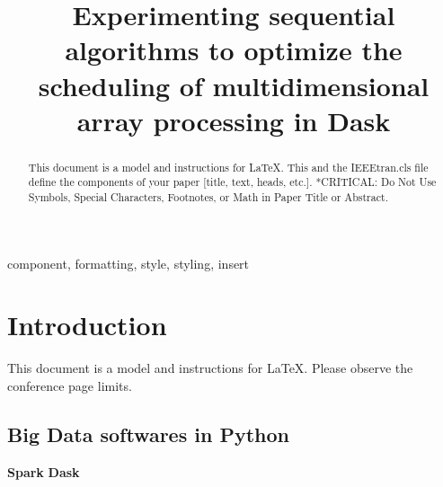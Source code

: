 \documentclass[conference]{IEEEtran}
\begin{document}
\title{ Experimenting sequential algorithms to optimize the scheduling of multidimensional array processing in Dask }

\author{
\and
{}
\and
{}
}

\maketitle

\begin{abstract}
This document is a model and instructions for \LaTeX.
This and the IEEEtran.cls file define the components of your paper [title, text, heads, etc.]. *CRITICAL: Do Not Use Symbols, Special Characters, Footnotes,
or Math in Paper Title or Abstract.
\end{abstract}

\begin{IEEEkeywords}
component, formatting, style, styling, insert
\end{IEEEkeywords}

\section*{Introduction}

This document is a model and instructions for \LaTeX.
Please observe the conference page limits.

\subsection{Big Data softwares in Python}
\textbf{Spark}
\textbf{Dask}
\end{document}
